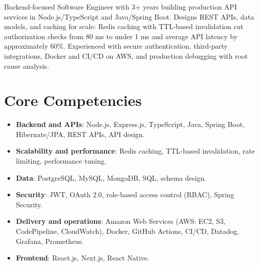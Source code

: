 \documentclass[11pt,a4paper,sans]{moderncv}
\begin{document}
\makecvtitle


\vspace{6pt}
{\small Backend-focused Software Engineer with 3+ years building production API services in Node.js/TypeScript and Java/Spring Boot. Designs REST APIs, data models, and caching for scale: Redis caching with TTL-based invalidation cut authorization checks from 80 ms to under 1 ms and average API latency by approximately 60\%. Experienced with secure authentication, third-party integrations, Docker and CI/CD on AWS, and production debugging with root cause analysis.\par}


\section{Core Competencies}
\vspace{1pt}
\begin{itemize}

\item \textbf{Backend and APIs}: Node.js, Express.js, TypeScript, Java, Spring Boot, Hibernate/JPA, REST APIs, API design.

\item \textbf{Scalability and performance}: Redis caching, TTL-based invalidation, rate limiting, performance tuning.

\item \textbf{Data}: PostgreSQL, MySQL, MongoDB, SQL, schema design.

\item \textbf{Security}: JWT, OAuth 2.0, role-based access control (RBAC), Spring Security.

\item \textbf{Delivery and operations}: Amazon Web Services (AWS: EC2, S3, CodePipeline, CloudWatch), Docker, GitHub Actions, CI/CD, Datadog, Grafana, Prometheus.

\item \textbf{Frontend}: React.js, Next.js, React Native.

\end{itemize}

\end{document}
